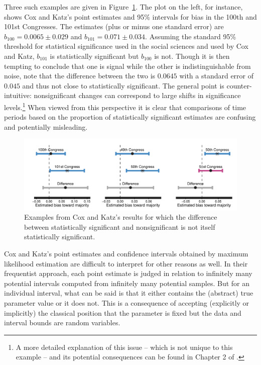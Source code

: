 Three such examples are given in Figure~\ref{fig:ck_signif}. The plot on the left, for instance, 
shows Cox and Katz's point estimates and 95\% intervals for bias in the 100th and 101st 
Congresses. The estimates (plus or minus one standard error) are $b_{100} = 0.0065 \pm 0.029$ 
and $b_{101} = 0.071 \pm 0.034$. Assuming the standard 95\% threshold for statistical significance 
used in the social sciences and used by Cox and Katz, $b_{101}$ is statistically significant 
but $b_{100}$ is not. Though it is then tempting to conclude that one is signal while the other 
is indistinguishable from noise, note that the difference between the two is 
$0.0645$ with a standard error of $0.045$ and thus not close to statistically significant. 
The general point is counter-intuitive: nonsignificant changes can correspond to large shifts 
in significance levels.\footnote{A more detailed explanation of this issue -- which is not unique to this 
example -- and its potential consequences can be found in Chapter 2 of 
.} When viewed from this perspective it is clear that comparisons of 
time periods based on the proportion of statistically significant estimates are confusing and
potentially misleading. 

\begin{figure}
\centering
\includegraphics[scale=0.75]{sections/figs/ck_signif_all}%
\caption{Examples from Cox and Katz's results for which the difference between statistically 
significant and nonsignificant is not itself statistically significant.}
\label{fig:ck_signif}
\end{figure}

Cox and Katz's point estimates and confidence intervals obtained by maximum likelihood estimation 
are difficult to interpret for other reasons as well. In their frequentist approach, each point estimate is
judged in relation to infinitely many potential intervals computed from infinitely many potential samples. 
But for an individual interval, what can be said is that it either contains the (abstract) true parameter 
value or it does not. This is a consequence of accepting (explicitly or implicitly) the classical position that the 
parameter is fixed but the data and interval bounds are random variables. 

